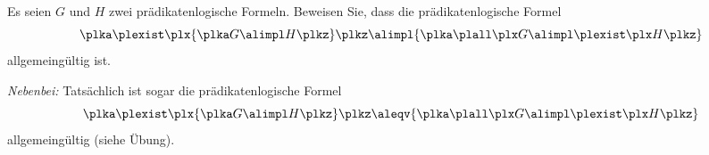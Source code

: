 \documentclass[12pt]{article}
\begin{document}

\begin{aufgabe}[4][Physik]
  Es seien $G$ und $H$ zwei prädikatenlogische Formeln. Beweisen Sie, dass die prädikatenlogische Formel
  \begin{equation*}
    {\plka \plexist \plx {\plka G \alimpl H \plkz} \plkz}
    \alimpl
    {\plka \plall \plx G \alimpl \plexist \plx H \plkz}
  \end{equation*}
  allgemeingültig ist.
\end{aufgabe}

\begin{loesung}
  \emph{Nebenbei:} Tatsächlich ist sogar die prädikatenlogische Formel
  \begin{equation*}
    {\plka \plexist \plx {\plka G \alimpl H \plkz} \plkz}
    \aleqv
    {\plka \plall \plx G \alimpl \plexist \plx H \plkz}
  \end{equation*}
  allgemeingültig (siehe Übung).


\end{loesung}
\end{document}
